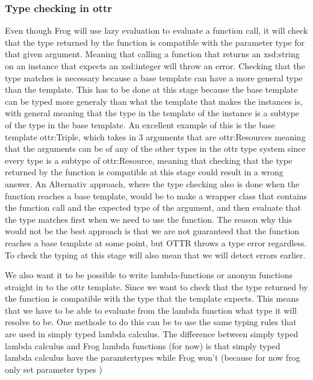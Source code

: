 \subsubsection{Type checking in ottr}
Even though Frog will use lazy evaluation to evaluate a function call, it will check that the type returned by the function is compatible with the parameter type for that given argument. Meaning that calling a function that returns an xsd:string on an instance that expects an xsd:integer will throw an error. Checking that the type matches is necessary because a base template can have a more general type than the template.  This has to be done at this stage because the base template can be typed more generaly than what the template that makes the instances is, with general meaning that the type in the template of the instance is a subtype of the type in the base template. An excellent example of this is the base template ottr:Triple, which takes in 3 arguments that are ottr:Resources meaning that the arguments can be of any of the other types in the ottr type system since every type is a subtype of ottr:Resource, meaning that checking that the type returned by the function is compatible at this stage could result in a wrong answer. An Alternativ approach, where the type checking also is done when the function reaches a base template, would be to make a wrapper class that contains the function call and the expected type of the argument, and then evaluate that the type matches first when we need to use the function. The reason why this would not be the best approach is that we are not guaranteed that the function reaches a base template at some point, but OTTR throws a type error regardless. To check the typing at this stage will also mean that we will detect errors earlier.

\para
We also want it to be possible to write lambda-functions or anonym functions straight in to the ottr template. Since we want to check that 
the type returned by the function is compatible with the type that the template expects. This means that we have to be able to evaluate from 
the lambda function what type it will resolve to be. One methode to do this can be to use the same typing rules that are used in 
simply typed lambda calculus. The difference between simply typed lambda calculus and Frog lambda functions (for now) is that simply typed 
lambda calculus have the paramtertypes while Frog won't (because for now frog only set parameter types )  

